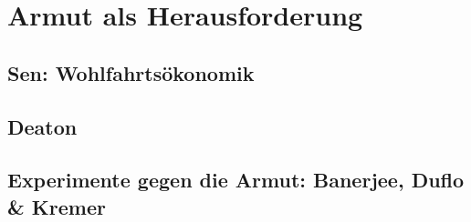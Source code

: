 %
%
%

\chapter{Armut als Herausforderung}
\label{Armut}

\section{Sen: Wohlfahrtsökonomik}

\section{Deaton}

\section{Experimente gegen die Armut: Banerjee, Duflo \& Kremer}


